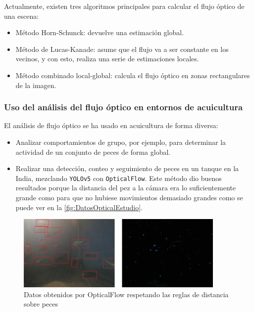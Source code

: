 Actualmente, existen tres algoritmos principales para calcular el flujo óptico de una escena:

\begin{itemize}
    \item Método Horn-Schunck: devuelve una estimación global.
    \item Método de Lucas-Kanade: asume que el flujo va a ser constante en los vecinos, y con esto, realiza una serie de estimaciones locales.
    \item Método combinado local-global: calcula el flujo óptico en zonas rectangulares de la imagen.
\end{itemize}

\subsubsection{Uso del análisis del flujo óptico en entornos de acuicultura}

El análisis de flujo óptico se ha usado en acuicultura de forma diversa:

\begin{itemize}
    \item Analizar comportamientos de grupo, por ejemplo, para determinar la actividad de un conjunto de peces de forma global\cite{kobayashiAquaColonyFully2023}.
    \item Realizar una detección, conteo y seguimiento de peces en un tanque en la India, mezclando \texttt{YOLOv5} con \texttt{OpticalFlow}\cite{paiComputerVisionBased2022}. Este método dio buenos resultados porque 
    la distancia del pez a la cámara era lo suficientemente grande como para que no hubiese movimientos demasiado grandes como se puede ver en la \autoref{fig:DatosOpticalEstudio}.
\end{itemize}

\begin{figure}[H]
    \centering
    \includegraphics[width=0.9\textwidth]{images/4/OpticalFlowIndia.png}
    \caption{Datos obtenidos por OpticalFlow respetando las reglas de distancia sobre peces\cite{paiComputerVisionBased2022}}
    \label{fig:DatosOpticalEstudio}
\end{figure}
\clearpage


